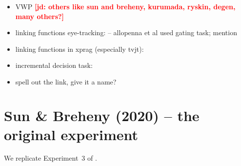 \documentclass[10pt,letterpaper]{article}
\newcommand{\expref}[1]{Experiment~#1}
\newcommand{\jd}[1]{\textcolor{Red}{\textbf{[jd: #1]}}}
\begin{document}
\begin{itemize}
	\item VWP \cite<VWP,>{tanenhaus1995,SedivyEtAl1999:Achieving-Incremental-Semantic-, LeffelXiangKennedy2016:Imprecision-is-Pragmatic-} \jd{others like sun and breheny, kurumada, ryskin, degen, many others?} 
	\item linking functions eye-tracking:  -- allopenna et al used gating task; mention
	\item linking functions in xprag (especially tvjt): \cite{Jasbi2019, WaldonDegen2020, franke2014typical, savinelli2018, franke2016link, scholler2017semantic, tessler2019language}
	\item incremental decision task: \cite{AllopennaEtAl1998:Tracking-the-Time-,QingLD2018, KreissDegen2020}
	\item spell out the link, give it a name?
\end{itemize}



\section{Sun \& Breheny (2020) -- the original experiment}

We replicate \expref{3} of . 
\end{document}
